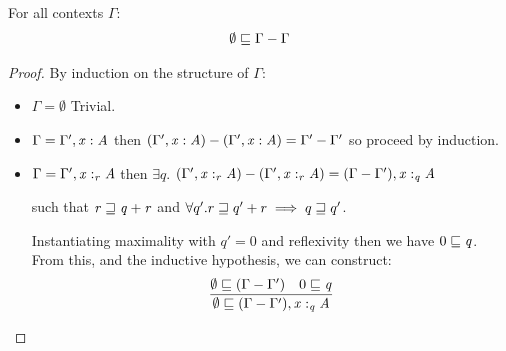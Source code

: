 \begin{lemma}
\label{lemma:context-neg}
For all contexts $\Gamma$:
\begin{align*}
\emptyset \sqsubseteq \Gamma  \GRANULEsym{-}  \Gamma
\end{align*}
\end{lemma}

\begin{proof}
By induction on the structure of $\Gamma$:
%
\begin{itemize}
\item $\Gamma = \emptyset$ Trivial.

\item $\Gamma = \Gamma'  \GRANULEsym{,}   \GRANULEmv{x}  :  \GRANULEnt{A}$ then
$\GRANULEsym{(}  \Gamma'  \GRANULEsym{,}   \GRANULEmv{x}  :  \GRANULEnt{A}   \GRANULEsym{)}  \GRANULEsym{-}  \GRANULEsym{(}  \Gamma'  \GRANULEsym{,}   \GRANULEmv{x}  :  \GRANULEnt{A}   \GRANULEsym{)} = \Gamma'  \GRANULEsym{-}  \Gamma'$ so proceed by
induction.

\item $\Gamma = \Gamma'  \GRANULEsym{,}   \GRANULEmv{x}  :_{\textcolor{coeffectColor}{  \GRANULEnt{r}  } }   \GRANULEnt{A}$ then
$\exists q. $
$\GRANULEsym{(}  \Gamma'  \GRANULEsym{,}   \GRANULEmv{x}  :_{\textcolor{coeffectColor}{  \GRANULEnt{r}  } }   \GRANULEnt{A}   \GRANULEsym{)}  \GRANULEsym{-}  \GRANULEsym{(}  \Gamma'  \GRANULEsym{,}   \GRANULEmv{x}  :_{\textcolor{coeffectColor}{  \GRANULEnt{r}  } }   \GRANULEnt{A}   \GRANULEsym{)} = \GRANULEsym{(}  \Gamma  \GRANULEsym{-}  \Gamma'  \GRANULEsym{)}  \GRANULEsym{,}   \GRANULEmv{x}  :_{\textcolor{coeffectColor}{  \GRANULEnt{q}  } }   \GRANULEnt{A}$

such that $\GRANULEnt{r} \sqsupseteq \GRANULEnt{q}  \GRANULEsym{+}  \GRANULEnt{r}$ and
$\maximal{q}{q'}{r}{q'+r}$.

Instantiating maximality with $q' = 0$ and reflexivity then we have
$0 \sqsubseteq \GRANULEnt{q}$. From this, and the inductive hypothesis, we can construct:
%
\begin{align*}
\dfrac{ \emptyset \sqsubseteq \GRANULEsym{(}  \Gamma  \GRANULEsym{-}  \Gamma'  \GRANULEsym{)} \quad 0 \sqsubseteq \GRANULEnt{q}}
{ \emptyset \sqsubseteq \GRANULEsym{(}  \Gamma  \GRANULEsym{-}  \Gamma'  \GRANULEsym{)}  \GRANULEsym{,}   \GRANULEmv{x}  :_{\textcolor{coeffectColor}{  \GRANULEnt{q}  } }   \GRANULEnt{A} }
\end{align*}
%
\end{itemize}
%
\end{proof}


